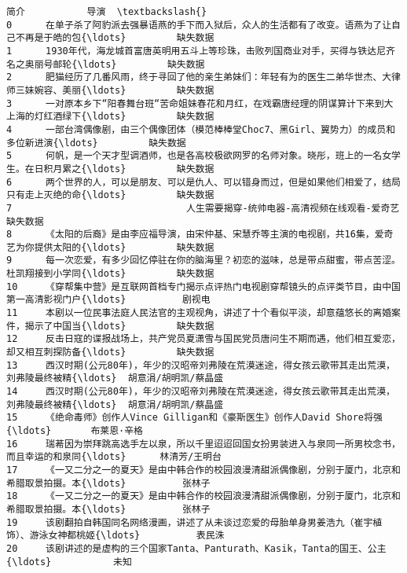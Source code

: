\documentclass[11pt]{article}
\begin{document}
\begin{Verbatim}[commandchars=\\\{\}]
                                                      简介           导演  \textbackslash{}
0      在单子杀了阿豹派去强暴语燕的手下而入狱后，众人的生活都有了改变。语燕为了让自己不再是于皓的包{\ldots}         缺失数据   
1      1930年代，海龙城首富唐英明用五斗上等珍珠，击败列国商业对手，买得与铁达尼齐名之奥丽号邮轮{\ldots}         缺失数据   
2      肥猫经历了几番风雨，终于寻回了他的亲生弟妹们：年轻有为的医生二弟华世杰、大律师三妹婉容、美丽{\ldots}         缺失数据   
3      一对原本乡下“阳春舞台班“苦命姐妹春花和月红，在戏霸唐经理的阴谋算计下来到大上海的灯红酒绿下{\ldots}         缺失数据   
4      一部台湾偶像剧，由三个偶像团体（模范棒棒堂Choc7、黑Girl、翼势力）的成员和多位新进演{\ldots}         缺失数据   
5      何帆，是一个天才型调酒师，也是各高校极欲网罗的名师对象。晓彤，班上的一名女学生。在日积月累之{\ldots}         缺失数据   
6      两个世界的人，可以是朋友、可以是仇人、可以错身而过，但是如果他们相爱了，结局只有走上灭绝的命{\ldots}         缺失数据   
7                               人生需要揭穿-统帅电器-高清视频在线观看-爱奇艺         缺失数据   
8      《太阳的后裔》是由李应福导演，由宋仲基、宋慧乔等主演的电视剧，共16集，爱奇艺为你提供太阳的{\ldots}         缺失数据   
9      每一次恋爱，有多少回忆停驻在你的脑海里？初恋的滋味，总是带点甜蜜，带点苦涩。杜凯翔接到小学同{\ldots}         缺失数据   
10     《穿帮集中营》是互联网首档专门揭示点评热门电视剧穿帮镜头的点评类节目，由中国第一高清影视门户{\ldots}          剧视电   
11     本剧以一位民事法庭人民法官的主观视角，讲述了十个看似平淡，却意蕴悠长的离婚案件，揭示了中国当{\ldots}         缺失数据   
12     反击日寇的谍报战场上，共产党员夏潇雪与国民党员唐问生不期而遇，他们相互爱恋，却又相互刺探防备{\ldots}         缺失数据   
13     西汉时期(公元80年)，年少的汉昭帝刘弗陵在荒漠迷途，得女孩云歌带其走出荒漠，刘弗陵最终被精{\ldots}  胡意涓/胡明凯/蔡晶盛   
14     西汉时期(公元80年)，年少的汉昭帝刘弗陵在荒漠迷途，得女孩云歌带其走出荒漠，刘弗陵最终被精{\ldots}  胡意涓/胡明凯/蔡晶盛   
15     《绝命毒师》创作人Vince Gilligan和《豪斯医生》创作人David Shore将强{\ldots}       布莱恩·辛格   
16     瑞莃因为崇拜跳高选手左以泉，所以千里迢迢回国女扮男装进入与泉同一所男校念书，而且幸运的和泉同{\ldots}      林清芳/王明台   
17     《一又二分之一的夏天》是由中韩合作的校园浪漫清甜派偶像剧，分别于厦门，北京和希腊取景拍摄。本{\ldots}          张林子   
18     《一又二分之一的夏天》是由中韩合作的校园浪漫清甜派偶像剧，分别于厦门，北京和希腊取景拍摄。本{\ldots}          张林子   
19     该剧翻拍自韩国同名网络漫画，讲述了从未谈过恋爱的母胎单身男姜浩九（崔宇植饰）、游泳女神都桃姬{\ldots}          表民洙   
20     该剧讲述的是虚构的三个国家Tanta、Panturath、Kasik，Tanta的国王、公主{\ldots}           未知   

\end{Verbatim}
\end{document}
